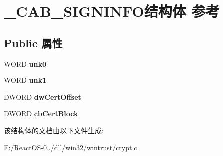 \hypertarget{struct___c_a_b___s_i_g_n_i_n_f_o}{}\section{\+\_\+\+C\+A\+B\+\_\+\+S\+I\+G\+N\+I\+N\+F\+O结构体 参考}
\label{struct___c_a_b___s_i_g_n_i_n_f_o}
\subsection*{Public 属性}
\begin{DoxyCompactItemize}
\item 
\mbox{\label{struct___c_a_b___s_i_g_n_i_n_f_o_afcb632d10ea6fba241bb19f5df75a4f8}} 
W\+O\+RD {\bfseries unk0}
\item 
\mbox{\label{struct___c_a_b___s_i_g_n_i_n_f_o_ac66b9fba81f299fa1fe4011bb9fcfdb8}} 
W\+O\+RD {\bfseries unk1}
\item 
\mbox{\label{struct___c_a_b___s_i_g_n_i_n_f_o_a9365803e51f639dfe21da6456ea6aff9}} 
D\+W\+O\+RD {\bfseries dw\+Cert\+Offset}
\item 
\mbox{\label{struct___c_a_b___s_i_g_n_i_n_f_o_a3b69d0df71a9dd5862bae47f629dde9e}} 
D\+W\+O\+RD {\bfseries cb\+Cert\+Block}
\end{DoxyCompactItemize}


该结构体的文档由以下文件生成\+:\begin{DoxyCompactItemize}
\item 
E\+:/\+React\+O\+S-\/0../dll/win32/wintrust/crypt.\+c\end{DoxyCompactItemize}
